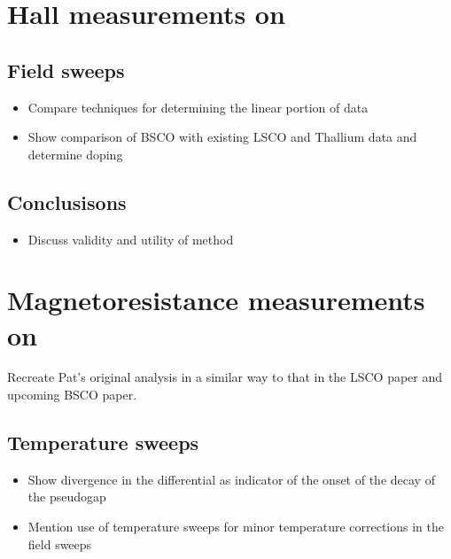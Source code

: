 \documentclass[11pt, a4paper]{article}
\begin{document}
\section{Hall measurements on \BSCO}

    \subsection{Field sweeps}
        \begin{itemize}
            \item Compare techniques for determining the linear portion of data
            \item Show comparison of BSCO with existing LSCO and Thallium data and determine doping
        \end{itemize}

    \subsection{Conclusisons}
        \begin{itemize}
            \item Discuss validity and utility of method
        \end{itemize}
    

\section{Magnetoresistance measurements on \BSCO}

    Recreate Pat's original analysis in a similar way to that in the LSCO paper and upcoming BSCO paper.

    \subsection{Temperature sweeps}
        \begin{itemize}
            \item Show divergence in the differential as indicator of the onset of the decay of the pseudogap
            \item Mention use of temperature sweeps for minor temperature corrections in the field sweeps
        \end{itemize}
\end{document}
